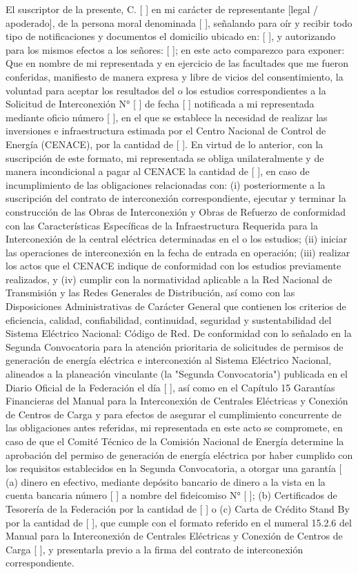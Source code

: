 El suscriptor de la presente, C. [ ] en mi carácter de representante [legal / apoderado], de la persona moral denominada [ ], señalando para oír y recibir todo tipo de notificaciones y documentos el domicilio ubicado en: [ ], y autorizando para los mismos efectos a los señores: [ ]; en este acto comparezco para exponer:
Que en nombre de mi representada y en ejercicio de las facultades que me fueron conferidas, manifiesto de manera expresa y libre de vicios del consentimiento, la voluntad para aceptar los resultados del o los estudios correspondientes a la Solicitud de Interconexión N° [ ] de fecha [ ] notificada a mi representada mediante oficio número [ ], en el que se establece la necesidad de realizar las inversiones e infraestructura estimada por el Centro Nacional de Control de Energía (CENACE), por la cantidad de [ ].
En virtud de lo anterior, con la suscripción de este formato, mi representada se obliga unilateralmente y de manera incondicional a pagar al CENACE la cantidad de [ ], en caso de incumplimiento de las obligaciones relacionadas con: (i) posteriormente a la suscripción del contrato de interconexión correspondiente, ejecutar y terminar la construcción de las Obras de Interconexión y Obras de Refuerzo de conformidad con las Características Específicas de la Infraestructura Requerida para la Interconexión de la central eléctrica determinadas en el o los estudios; (ii) iniciar las operaciones de interconexión en la fecha de entrada en operación; (iii) realizar los actos que el CENACE indique de conformidad con los estudios previamente realizados, y (iv) cumplir con la normatividad aplicable a la Red Nacional de Transmisión y las Redes Generales de Distribución, así como con las Disposiciones Administrativas de Carácter General que contienen los criterios de eficiencia, calidad, confiabilidad, continuidad, seguridad y sustentabilidad del Sistema Eléctrico Nacional: Código de Red.
De conformidad con lo señalado en la Segunda Convocatoria para la atención prioritaria de solicitudes de permisos de generación de energía eléctrica e interconexión al Sistema Eléctrico Nacional, alineados a la planeación vinculante (la "Segunda Convocatoria") publicada en el Diario Oficial de la Federación el día [ ], así como en el Capítulo 15 Garantías Financieras del Manual para la Interconexión de Centrales Eléctricas y Conexión de Centros de Carga y para efectos de asegurar el cumplimiento concurrente de las obligaciones antes referidas, mi representada en este acto se compromete, en caso de que el Comité Técnico de la Comisión Nacional de Energía determine la aprobación del permiso de generación de energía eléctrica por haber cumplido con los requisitos establecidos en la Segunda Convocatoria, a otorgar una garantía [ (a) dinero en efectivo, mediante depósito bancario de dinero a la vista en la cuenta bancaria número [ ] a nombre del fideicomiso N° [ ]; (b) Certificados de Tesorería de la Federación por la cantidad de [ ] o (c) Carta de Crédito Stand By por la cantidad de [ ], que cumple con el formato referido en el numeral 15.2.6 del Manual para la Interconexión de Centrales Eléctricas y Conexión de Centros de Carga [ ], y presentarla previo a la firma del contrato de interconexión correspondiente.
